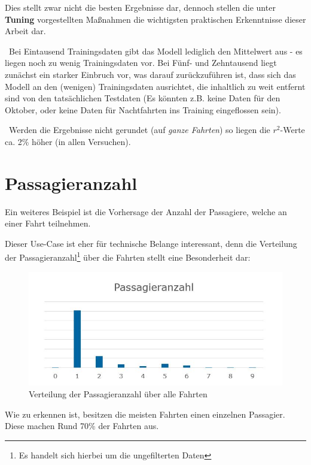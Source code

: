 Dies stellt zwar nicht die besten Ergebnisse dar, dennoch stellen die unter \textbf{Tuning} vorgestellten Maßnahmen die wichtigsten praktischen Erkenntnisse dieser Arbeit dar. 

~\newline Bei Eintausend Trainingsdaten gibt das Modell lediglich den Mittelwert aus - es liegen noch zu wenig Trainingsdaten vor. Bei Fünf- und Zehntausend liegt zunächst ein starker Einbruch vor, was darauf zurückzuführen ist, dass sich das Modell an den (wenigen) Trainingsdaten ausrichtet, die inhaltlich zu weit entfernt sind von den tatsächlichen Testdaten (Es könnten z.B. keine Daten für den Oktober, oder keine Daten für Nachtfahrten ins Training eingeflossen sein).

~\newline Werden die Ergebnisse nicht gerundet (auf \textit{ganze Fahrten}) so liegen die $r^2$-Werte ca. 2\% höher (in allen Versuchen).
\newpage
\section{Passagieranzahl}
\label{sec:PasPred}
Ein weiteres Beispiel ist die Vorhersage der Anzahl der Passagiere, welche an einer Fahrt teilnehmen. 

Dieser Use-Case ist eher für technische Belange interessant, denn die Verteilung der Passagieranzahl\footnote{Es handelt sich hierbei um die ungefilterten Daten} über die Fahrten stellt eine Besonderheit dar: 


\begin{figure}[h]
	\begin{center}
		\includegraphics[width=0.8\linewidth]{Bilder/PassagierVerteilung}
		\caption[Verteilung der Passagieranzahl]{Verteilung der Passagieranzahl über alle Fahrten}
		\label{fig:PassagierVerteilung}
	\end{center}
\end{figure}


Wie zu erkennen ist, besitzen die meisten Fahrten einen einzelnen Passagier. Diese machen Rund 70\% der Fahrten aus.

